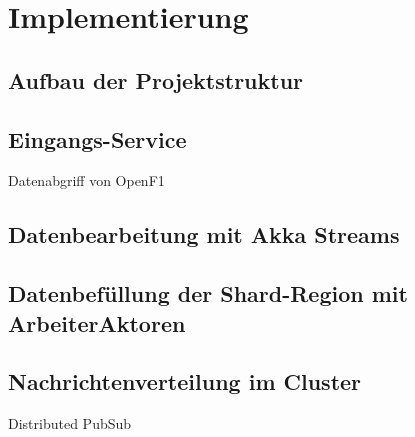 \chapter{Implementierung}

\section{Aufbau der Projektstruktur}
\section{Eingangs-Service}
Datenabgriff von OpenF1

\section{Datenbearbeitung mit Akka Streams}

\section{Datenbefüllung der Shard-Region mit ArbeiterAktoren}

\section{Nachrichtenverteilung im Cluster}
Distributed PubSub
